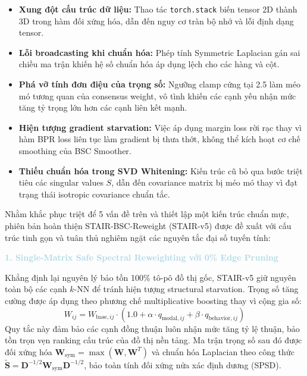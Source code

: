\begin{itemize}
    \item \textbf{Xung đột cấu trúc dữ liệu:} Thao tác \texttt{torch.stack} biến tensor 2D thành 3D trong hàm đối xứng hóa, dẫn đến nguy cơ tràn bộ nhớ và lỗi định dạng tensor.
    \item \textbf{Lỗi broadcasting khi chuẩn hóa:} Phép tính Symmetric Laplacian gán sai chiều ma trận khiến hệ số chuẩn hóa áp dụng lệch cho các hàng và cột.
    \item \textbf{Phá vỡ tính đơn điệu của trọng số:} Ngưỡng clamp cứng tại 2.5 làm méo mó tương quan của consensus weight, vô tình khiến các cạnh yếu nhận mức tăng tỷ trọng lớn hơn các cạnh liên kết mạnh.
    \item \textbf{Hiện tượng gradient starvation:} Việc áp dụng margin loss rời rạc thay vì hàm BPR loss liên tục làm gradient bị thưa thớt, không thể kích hoạt cơ chế smoothing của BSC Smoother.
    \item \textbf{Thiếu chuẩn hóa trong SVD Whitening:} Kiến trúc cũ bỏ qua bước triệt tiêu các singular values $S$, dẫn đến covariance matrix bị méo mó thay vì đạt trạng thái isotropic covariance chuẩn tắc.
\end{itemize}

Nhằm khắc phục triệt để 5 vấn đề trên và thiết lập một kiến trúc chuẩn mực, phiên bản hoàn thiện STAIR-BSC-Reweight (STAIR-v5) được đề xuất với cấu trúc tinh gọn và tuân thủ nghiêm ngặt các nguyên tắc đại số tuyến tính:

\medskip
\noindent\textcolor{lightblue}{\textbf{1. Single-Matrix Safe Spectral Reweighting với 0\% Edge Pruning}}

Khẳng định lại nguyên lý bảo tồn 100\% tô-pô đồ thị gốc, STAIR-v5 giữ nguyên toàn bộ các cạnh $k$-NN để tránh hiện tượng structural starvation. Trọng số tăng cường được áp dụng theo phương chế multiplicative boosting thay vì cộng gia số:
\begin{equation}
W_{ij} = W_{\text{base}, ij} \cdot \left(1.0 + \alpha \cdot q_{\text{modal}, ij} + \beta \cdot q_{\text{behavior}, ij}\right)
\end{equation}
Quy tắc này đảm bảo các cạnh đồng thuận luôn nhận mức tăng tỷ lệ thuận, bảo tồn trọn vẹn ranking cấu trúc của đồ thị nền tảng. Ma trận trọng số sau đó được đối xứng hóa $\mathbf{W}_{\text{sym}} = \max(\mathbf{W}, \mathbf{W}^T)$ và chuẩn hóa Laplacian theo công thức $\tilde{\mathbf{S}} = \mathbf{D}^{-1/2} \mathbf{W}_{\text{sym}} \mathbf{D}^{-1/2}$, bảo toàn tính đối xứng nửa xác định dương (SPSD).

